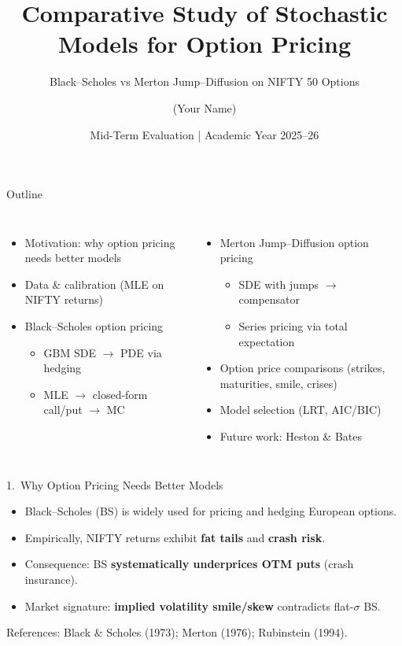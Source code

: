 \documentclass[aspectratio=169,10pt]{beamer}
\title[BS vs MJD Option Pricing]{Comparative Study of Stochastic Models for Option Pricing}
\subtitle{Black--Scholes vs Merton Jump--Diffusion on NIFTY 50 Options}
\author{(Your Name)}
\institute{Department of Mathematics, IIT Roorkee \\ Under supervision of Prof.\ Chaman Kumar}
\date{Mid-Term Evaluation \;|\; Academic Year 2025--26}
\begin{document}
\begin{frame}
  \titlepage
\end{frame}

\begin{frame}{Outline}
  \begin{columns}[T]
    \begin{itemize}
      \item Motivation: why option pricing needs better models
      \item Data \& calibration (MLE on NIFTY returns)
      \item Black--Scholes option pricing
      \begin{itemize}
        \item GBM SDE \(\rightarrow\) PDE via hedging
        \item MLE \(\rightarrow\) closed-form call/put \(\rightarrow\) MC
      \end{itemize}
    \end{itemize}
    \begin{itemize}
      \item Merton Jump--Diffusion option pricing
      \begin{itemize}
        \item SDE with jumps \(\rightarrow\) compensator
        \item Series pricing via total expectation
      \end{itemize}
      \item Option price comparisons (strikes, maturities, smile, crises)
      \item Model selection (LRT, AIC/BIC)
      \item Future work: Heston \& Bates
    \end{itemize}
  \end{columns}
\end{frame}

\begin{frame}{1.\ Why Option Pricing Needs Better Models}
  \begin{itemize}
    \item Black--Scholes (BS) is widely used for pricing and hedging European options.
    \item Empirically, NIFTY returns exhibit \textbf{fat tails} and \textbf{crash risk}.
    \item Consequence: BS \textbf{systematically underprices OTM puts} (crash insurance).
    \item Market signature: \textbf{implied volatility smile/skew} contradicts flat-\(\sigma\) BS.
  \end{itemize}
  \vspace{0.5em}
  \small References: Black \& Scholes (1973); Merton (1976); Rubinstein (1994).
\end{frame}
\end{document}
